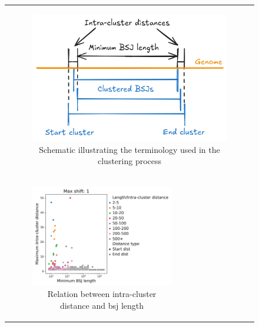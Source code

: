 \begin{figure}[ht]
    \begin{tabular}{cc}
        \multicolumn{2}{c}{
            \begin{subfigure}{\textwidth}
                \centering

                \includegraphics[width=0.7\linewidth]{chapters/4_results_and_discussion/figures/grouping.png}
                \caption{Schematic illustrating the terminology used in the
                    clustering process}
                \label{fig:clustering_expl}
            \end{subfigure}}
        \\
        \begin{subfigure}{0.5\textwidth}
            \centering

            \includegraphics[width=\linewidth]{chapters/4_results_and_discussion/figures/detection/distances/diff_1_scatter.png}
            \caption{Relation between intra-cluster distance and \gls{bsj}
                length}
            \label{fig:clustering_scatter}
        \end{subfigure} &
        \begin{subfigure}{0.5\textwidth}
            \centering


\end{subfigure}
\end{tabular}
\end{figure}
